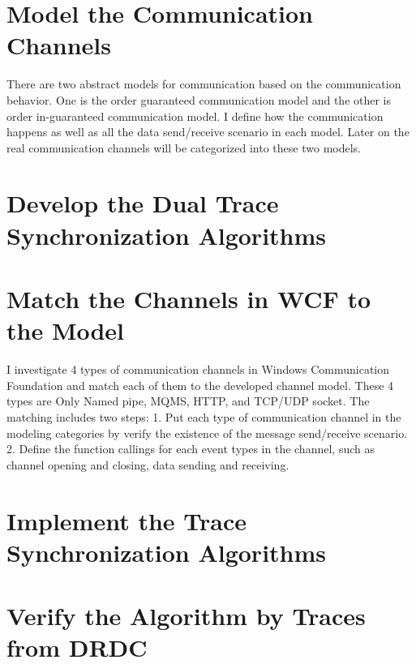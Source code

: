 \section{Model the Communication Channels}
There are two abstract models for communication based on the communication behavior. One is the order guaranteed communication model and the other is order in-guaranteed communication model. I define  how the communication happens as well as all the data send/receive scenario in each model. Later on the real communication channels will be categorized into these two models. 


\section{Develop the Dual Trace Synchronization Algorithms}


\section{Match the Channels in WCF to the Model}
I investigate 4 types of communication channels in Windows Communication Foundation and match each of them to the developed channel model. These 4 types are Only Named pipe, MQMS, HTTP, and TCP/UDP socket. The matching includes two steps: 1. Put each type of communication channel in the modeling categories by verify the existence of the message send/receive scenario. 2. Define the function callings for each event types in the channel, such as channel opening and closing, data sending and receiving. 

\section{Implement the Trace Synchronization Algorithms}

\section{Verify the Algorithm by Traces from DRDC}



\setlength{\unitlength}{\savedunitlength}

